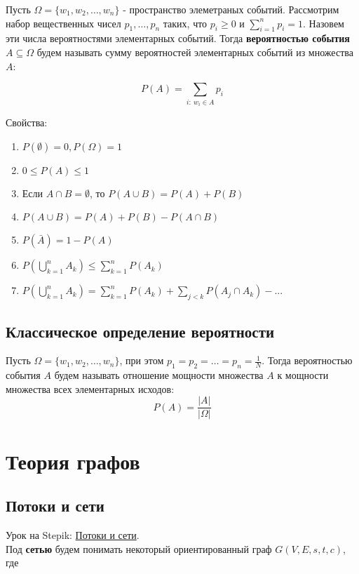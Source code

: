 \documentclass{article}
\begin{document}
Пусть $\Omega = \{w_1, w_2, \dots, w_n\}$ - пространство элеметраных событий. Рассмотрим набор вещественных чисел $p_1, \dots, p_n$ таких, что $p_i \ge 0$ и $\sum_{i=1}^{n} p_i = 1$. Назовем эти числа вероятностями элементарных событий. Тогда \textbf{вероятностью события} $A \subseteq \Omega$ будем называть сумму вероятностей элементарных событий из множества $A$:

$$ P(A) = \sum_{i: \ w_i \in A} p_i $$

Свойства:

\begin{enumerate}
	\item $P(\emptyset) = 0, P(\Omega) = 1$
	\item $0 \le P(A) \le 1$
	\item Если $A \cap B = \emptyset$, то $P(A \cup B) = P(A) + P(B)$
	\item $P(A \cup B) = P(A) + P(B) - P(A \cap B)$
	\item $P(\bar{A}) = 1 - P(A)$
	\item $P\left(\bigcup_{k = 1}^{n} A_k \right) \le \sum_{k = 1}^{n} P(A_k)$
	\item $P\left(\bigcup_{k = 1}^{n} A_k \right) = \sum_{k = 1}^{n} P(A_k) + \sum_{j < k} P(A_j \cap A_k) - ...$
\end{enumerate}

\subsection{Классическое определение вероятности}

Пусть $\Omega = \{w_1, w_2, \dots, w_n\}$, при этом $p_1 = p_2 = \dots = p_n = \frac{1}{N}$. Тогда вероятностью события $A$ будем называть отношение мощности множества $A$ к мощности множества всех элементарных исходов: $$ P(A) = \frac{|A|}{|\Omega|} $$

\section{Теория графов}

\subsection{Потоки и сети}

Урок на Stepik: \href{https://stepik.org/lesson/36127/step/10?unit=44097}{Потоки и сети}. \\

Под \textbf{сетью} будем понимать некоторый ориентированный граф $G(V, E, s, t, c)$, где
\end{document}

